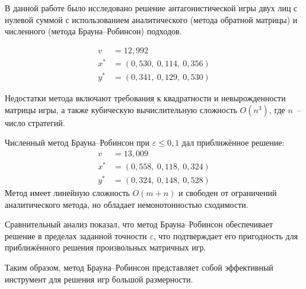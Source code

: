 \conclusion

В данной работе было исследовано решение антагонистической игры двух лиц с нулевой суммой 
с использованием аналитического (метода обратной матрицы) и численного (метода Брауна--Робинсон) 
подходов.

\begin{align*}
v &= 12{,}992 \\
x^* &= (0{,}530,\ 0{,}114,\ 0{,}356) \\
y^* &= (0{,}341,\ 0{,}129,\ 0{,}530)
\end{align*}

Недостатки метода включают требования к квадратности и невырожденности матрицы игры, 
а также кубическую вычислительную сложность $O(n^3)$, где $n$~-- число стратегий.

Численный метод Брауна--Робинсон при $\varepsilon \leq 0{,}1$ дал приближённое решение:
\begin{align*}
v &= 13{,}009 \\
x^{*} &= (0{,}558,\ 0{,}118,\ 0{,}324) \\
y^{*} &= (0{,}324,\ 0{,}148,\ 0{,}528)
\end{align*}
Метод имеет линейную сложность $O(m + n)$ и свободен от ограничений аналитического метода, 
но обладает немонотонностью сходимости.

Сравнительный анализ показал, что метод Брауна--Робинсон обеспечивает решение 
в пределах заданной точности $\varepsilon$, что подтверждает его пригодность для 
приближённого решения произвольных матричных игр.

Таким образом, метод Брауна--Робинсон представляет собой эффективный инструмент 
для решения игр большой размерности.
